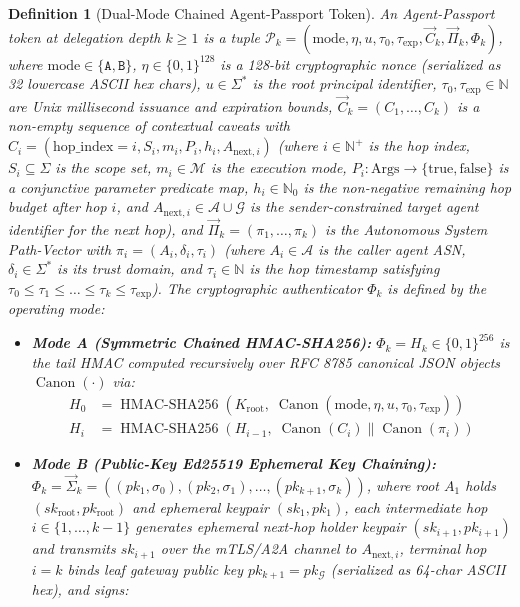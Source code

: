\documentclass[conference,10pt]{IEEEtran}
\newtheorem{definition}{Definition}
\begin{document}
\begin{definition}[Dual-Mode Chained Agent-Passport Token]
\label{def:passport}
An Agent-Passport token at delegation depth $k \ge 1$ is a tuple $\mathcal{P}_k = (\text{mode}, \eta, u, \tau_0, \tau_{\exp}, \vec{C}_k, \vec{\Pi}_k, \Phi_k)$, where $\text{mode} \in \{\texttt{A}, \texttt{B}\}$, $\eta \in \{0,1\}^{128}$ is a 128-bit cryptographic nonce (serialized as 32 lowercase ASCII hex chars), $u \in \Sigma^*$ is the root principal identifier, $\tau_0, \tau_{\exp} \in \mathbb{N}$ are Unix millisecond issuance and expiration bounds, $\vec{C}_k = (C_1, \dots, C_k)$ is a non-empty sequence of contextual caveats with $C_i = (\text{hop\_index}=i, S_i, m_i, P_i, h_i, A_{\text{next},i})$ (where $i \in \mathbb{N}^+$ is the hop index, $S_i \subseteq \Sigma$ is the scope set, $m_i \in \mathcal{M}$ is the execution mode, $P_i: \text{Args} \to \{\text{true}, \text{false}\}$ is a conjunctive parameter predicate map, $h_i \in \mathbb{N}_0$ is the non-negative remaining hop budget \emph{after} hop $i$, and $A_{\text{next},i} \in \mathcal{A} \cup \mathcal{G}$ is the sender-constrained target agent identifier for the next hop), and $\vec{\Pi}_k = (\pi_1, \dots, \pi_k)$ is the Autonomous System Path-Vector with $\pi_i = (A_i, \delta_i, \tau_i)$ (where $A_i \in \mathcal{A}$ is the caller agent ASN, $\delta_i \in \Sigma^*$ is its trust domain, and $\tau_i \in \mathbb{N}$ is the hop timestamp satisfying $\tau_0 \le \tau_1 \le \dots \le \tau_k \le \tau_{\exp}$). The cryptographic authenticator $\Phi_k$ is defined by the operating mode:
\begin{itemize}
    \item \textbf{Mode A (Symmetric Chained HMAC-SHA256):} $\Phi_k = H_k \in \{0,1\}^{256}$ is the tail HMAC computed recursively over RFC 8785 canonical JSON objects $\operatorname{Canon}(\cdot)$ via:
    {\scriptsize
    \begin{align}
    H_0 &= \operatorname{HMAC-SHA256}\!\left(K_{\text{root}},\; \operatorname{Canon}(\text{mode},\eta,u,\tau_0,\tau_{\exp})\right) \label{eq:h0} \\
    H_i &= \operatorname{HMAC-SHA256}\!\left(H_{i-1},\; \operatorname{Canon}(C_i) \parallel \operatorname{Canon}(\pi_i)\right) \label{eq:hi}
    \end{align}}
    \item \textbf{Mode B (Public-Key Ed25519 Ephemeral Key Chaining):} $\Phi_k = \vec{\Sigma}_k = ((pk_1, \sigma_0), (pk_2, \sigma_1), \dots, (pk_{k+1}, \sigma_k))$, where root $A_1$ holds $(sk_{\text{root}}, pk_{\text{root}})$ and ephemeral keypair $(sk_1, pk_1)$, each intermediate hop $i \in \{1, \dots, k-1\}$ generates ephemeral next-hop holder keypair $(sk_{i+1}, pk_{i+1})$ and transmits $sk_{i+1}$ over the mTLS/A2A channel to $A_{\text{next},i}$, terminal hop $i = k$ binds leaf gateway public key $pk_{k+1} = pk_{\mathcal{G}}$ (serialized as 64-char ASCII hex), and signs:

\end{itemize}
\end{definition}
\end{document}
